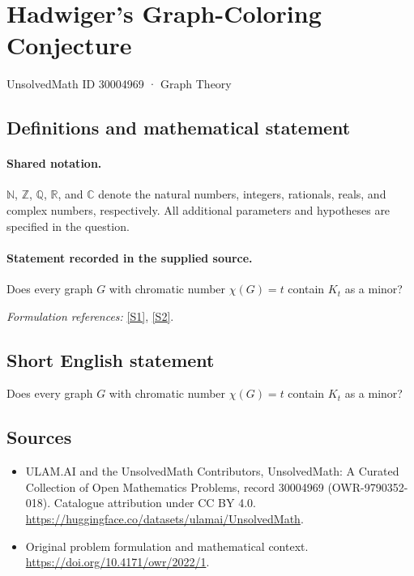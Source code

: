 \documentclass[11pt]{article}
\newcommand{\sref}[2]{\hyperlink{source:#1:#2}{[S#2]}}
\begin{document}
\setcounter{section}{30004968}
\section{Hadwiger’s Graph-Coloring Conjecture}\label{30004969}
{\small UnsolvedMath ID 30004969 · Graph Theory}
\subsection{Definitions and mathematical statement}

\paragraph{Shared notation.}$\mathbb N$, $\mathbb Z$, $\mathbb Q$, $\mathbb R$, and $\mathbb C$ denote the natural numbers, integers, rationals, reals, and complex numbers, respectively. All additional parameters and hypotheses are specified in the question.


\paragraph{Statement recorded in the supplied source.}
Does every graph $G$ with chromatic number $\chi(G)=t$ contain $K_t$ as a minor?
\par\smallskip\textit{Formulation references:} \sref{30004969}{1}, \sref{30004969}{2}.
\subsection{Short English statement}
Does every graph $G$ with chromatic number $\chi(G)=t$ contain $K_t$ as a minor?
\subsection{Sources}
\begin{itemize}
\item[\hypertarget{source:30004969:1}{S1}] ULAM.AI and the UnsolvedMath Contributors, UnsolvedMath: A Curated Collection of Open Mathematics Problems, record 30004969 (OWR-9790352-018). Catalogue attribution under CC BY 4.0.
\url{https://huggingface.co/datasets/ulamai/UnsolvedMath}.
\item[\hypertarget{source:30004969:2}{S2}] Original problem formulation and mathematical context.
\url{https://doi.org/10.4171/owr/2022/1}.
\end{itemize}
\label{end:30004969}
\end{document}
